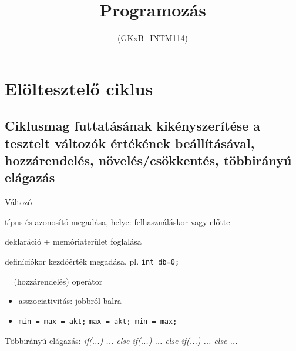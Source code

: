 \documentclass[usenames,dvipsnames,aspectratio=169]{beamer}
\title[2. előadás]{Programozás}
\subtitle{(GKxB\_INTM114)}
\begin{document}
\begin{frame}[plain]
  \titlepage
  \logoalul
\end{frame}

\section{Elöltesztelő ciklus}
\subsection{Ciklusmag futtatásának kikényszerítése a tesztelt változók értékének beállításával, hozzárendelés, növelés/csökkentés, többirányú elágazás}

\begin{frame}
  \begin{exampleblock}{}
    \vspace{-.2cm}
    
    \vspace{-.2cm}
  \end{exampleblock}
\end{frame}

\begin{frame}
  Változó
  \begin{description}[inicializáció]
    \item[deklaráció] típus és azonosító megadása, helye: felhasználáskor vagy előtte
    \item[definíció] deklaráció + memóriaterület foglalása
    \item[inicializáció] definíciókor kezdőérték megadása, pl. \texttt{int db=0;}
  \end{description}
  \vfill
  = (hozzárendelés) operátor
  \begin{itemize}
    \item asszociativitás: jobbról balra
    \item \texttt{min = max = akt;} \kiemel{$\equiv$} \texttt{max = akt; min = max;}
  \end{itemize}
  \vfill
  Többirányú elágazás: \emph{if(...) ... else if(...) ... else if(...) ... else ...} \\
\end{frame}
\end{document}

